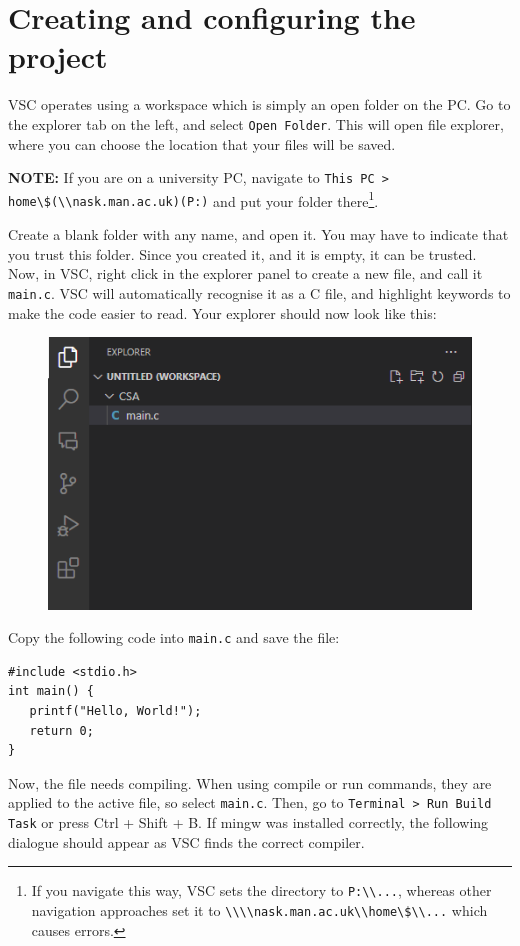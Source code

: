 \documentclass{article}
\newcommand{\code}[1]{\colorbox{codegrey}{\lstinline|#1|}}
\begin{document}
\section{Creating and configuring the project}\label{Section_3}

VSC operates using a workspace which is simply an open folder on the PC. Go to the explorer tab on the left, and select \code{Open Folder}. This will open file explorer, where you can choose the location that your files will be saved. 
\par
\textbf{NOTE: } If you are on a university PC, navigate to \code{This PC > home\$(\\nask.man.ac.uk)(P:)} and put your folder there\footnote{If you navigate this way, VSC sets the directory to \code{P:\\...}, whereas other navigation approaches set it to \code{\\\\nask.man.ac.uk\\home\$\\...} which causes errors.}. 
\par 
Create a blank folder with any name, and open it. You may have to indicate that you trust this folder. Since you created it, and it is empty, it can be trusted. Now, in VSC, right click in the explorer panel to create a new file, and call it \code{main.c}. VSC will automatically recognise it as a C file, and highlight keywords to make the code easier to read. Your explorer should now look like this:
\begin{figure}[H]
    \centering
    \includegraphics[width=0.5\linewidth]{explorer.png}
    \label{fig:enter-label}
\end{figure}

Copy the following code into \code{main.c} and save the file:

\begin{verbatim}
#include <stdio.h> 
int main() {
   printf("Hello, World!");
   return 0;
}
\end{verbatim}

Now, the file needs compiling. When using compile or run commands, they are applied to the active file, so select \code{main.c}. Then, go to \code{Terminal > Run Build Task} or press Ctrl + Shift + B. If mingw was installed correctly, the following dialogue should appear as VSC finds the correct compiler.
\end{document}
